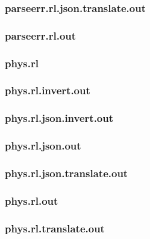 \subsubsection{parseerr.rl.json.translate.out}
\label{app:parseerr_rl.json.translate.out}

\subsubsection{parseerr.rl.out}
\label{app:parseerr_rl.out}

\subsubsection{phys.rl}
\label{app:phys_rl}

\subsubsection{phys.rl.invert.out}
\label{app:phys_rl.invert.out}

\subsubsection{phys.rl.json.invert.out}
\label{app:phys_rl.json.invert.out}

\subsubsection{phys.rl.json.out}
\label{app:phys_rl.json.out}

\subsubsection{phys.rl.json.translate.out}
\label{app:phys_rl.json.translate.out}

\subsubsection{phys.rl.out}
\label{app:phys_rl.out}

\subsubsection{phys.rl.translate.out}
\label{app:phys_rl.translate.out}

